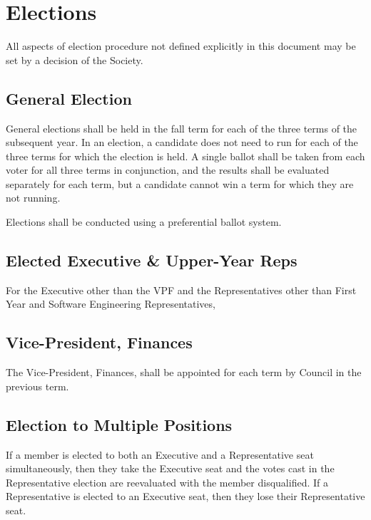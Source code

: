 \section{Elections}
All aspects of election procedure not defined explicitly in this document may be
set by a decision of the Society.

\subsection{General Election}
General elections shall be held in the fall term for each of the three terms 
of the subsequent year. In an election, a candidate does not need to run for 
each of the three terms for which the election is held. A single ballot shall 
be taken from each voter for all three terms in conjunction, and the results 
shall be evaluated separately for each term, but a candidate cannot win a term 
for which they are not running.

Elections shall be conducted using a preferential ballot system.

\subsection{Elected Executive \& Upper-Year Reps}
For the Executive other than the VPF and the Representatives other than First
Year and Software Engineering Representatives,

\subsection{Vice-President, Finances}
The Vice-President, Finances, shall be appointed for each term by Council in the
previous term.

\subsection{Election to Multiple Positions}
If a member is elected to both an Executive and a Representative seat
simultaneously, then they take the Executive seat and the votes cast in the
Representative election are reevaluated with the member disqualified. If a
Representative is elected to an Executive seat, then they lose their
Representative seat.
